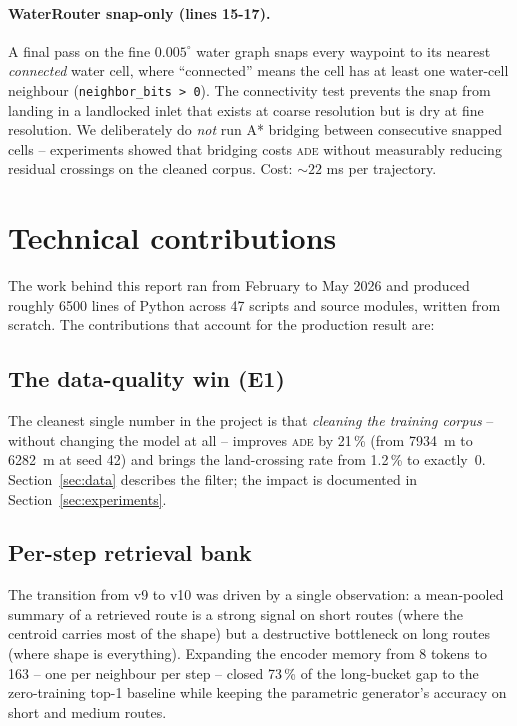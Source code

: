 \documentclass[11pt,a4paper]{article}
\newcommand{\ade}{\textsc{ade}}
\newcommand{\code}[1]{\texttt{\small #1}}
\begin{document}
\paragraph{WaterRouter snap-only (lines 15-17).}\label{sec:router}
A final pass on the fine $0.005^\circ$ water graph snaps every waypoint
to its nearest \emph{connected} water cell, where ``connected'' means
the cell has at least one water-cell neighbour
(\code{neighbor\_bits > 0}).  The connectivity test prevents the snap
from landing in a landlocked inlet that exists at coarse resolution but
is dry at fine resolution.  We deliberately do \emph{not} run A*
bridging between consecutive snapped cells -- experiments showed that
bridging costs \ade{} without measurably reducing residual crossings on
the cleaned corpus.  Cost: $\sim 22$ ms per trajectory.

\section{Technical contributions}\label{sec:contrib}

The work behind this report ran from February to May 2026 and produced
roughly 6500 lines of Python across 47 scripts and source modules,
written from scratch.  The contributions that account for the
production result are:

\subsection{The data-quality win (E1)}

The cleanest single number in the project is that \emph{cleaning the
training corpus} -- without changing the model at all -- improves \ade{}
by 21\,\% (from 7934~m to 6282~m at seed 42) and brings the
land-crossing rate from 1.2\,\% to exactly~0.  Section~\ref{sec:data}
describes the filter; the impact is documented in
Section~\ref{sec:experiments}.

\subsection{Per-step retrieval bank}

The transition from v9 to v10 was driven by a single observation: a
mean-pooled summary of a retrieved route is a strong signal on short
routes (where the centroid carries most of the shape) but a destructive
bottleneck on long routes (where shape is everything).  Expanding the
encoder memory from 8 tokens to 163 -- one per neighbour per step --
closed 73\,\% of the long-bucket gap to the zero-training top-1
baseline while keeping the parametric generator's accuracy on short and
medium routes.
\end{document}
